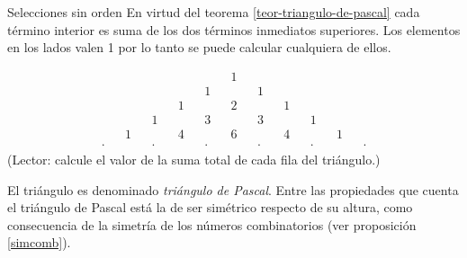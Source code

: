 \begin{section}{Selecciones sin orden}
En virtud del teorema \ref{teor-triangulo-de-pascal} cada término interior es
suma de los dos términos inmediatos superiores. Los elementos
en los lados valen 1 por lo tanto se puede calcular cualquiera
de ellos.


\begin{align*}
&& && && && && &1& && && && && &&  \\
&& && && && &1& && &1& && && && &&  \\
&& && && &1& && &2& && &1& && && &&  \\
&& && &1& && &3& && &3& && &1& && &&  \\
&& &1& && &4& && &6& && &4& && &1& &&  \\
&\cdot& && &\cdot& && &\cdot& && &\cdot& && &\cdot& && &\cdot& 
\end{align*}
(Lector: calcule el valor de la suma total de cada fila del triángulo.)

El  triángulo es denominado \emph{triángulo de Pascal}. Entre las propiedades que cuenta el triángulo de Pascal está la de ser simétrico respecto de su altura, como consecuencia de la simetría de los números combinatorios (ver proposición \ref{simcomb}). 





\end{section}


